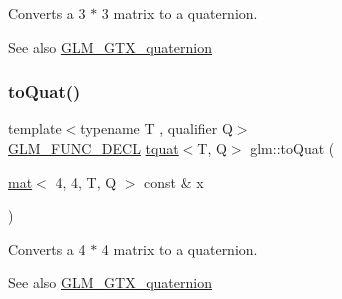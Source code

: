Converts a 3 $\ast$ 3 matrix to a quaternion.

\begin{DoxySeeAlso}{See also}
\hyperlink{group__gtx__quaternion}{G\+L\+M\+\_\+\+G\+T\+X\+\_\+quaternion} 
\end{DoxySeeAlso}
\mbox{\label{group__gtx__quaternion_ga6c0a178ac9c7d23e1a6848045d83aa54}} 
\subsubsection{\texorpdfstring{to\+Quat()}{toQuat()}\hspace{0.1cm}{\footnotesize\ttfamily [2/2]}}
{\footnotesize\ttfamily template$<$typename T , qualifier Q$>$ \\
\hyperlink{setup_8hpp_ab2d052de21a70539923e9bcbf6e83a51}{G\+L\+M\+\_\+\+F\+U\+N\+C\+\_\+\+D\+E\+CL} \hyperlink{structglm_1_1tquat}{tquat}$<$T, Q$>$ glm\+::to\+Quat (\begin{DoxyParamCaption}\item[{\hyperlink{structglm_1_1mat}{mat}$<$ 4, 4, T, Q $>$ const \&}]{x }\end{DoxyParamCaption})}

Converts a 4 $\ast$ 4 matrix to a quaternion.

\begin{DoxySeeAlso}{See also}
\hyperlink{group__gtx__quaternion}{G\+L\+M\+\_\+\+G\+T\+X\+\_\+quaternion} 
\end{DoxySeeAlso}
